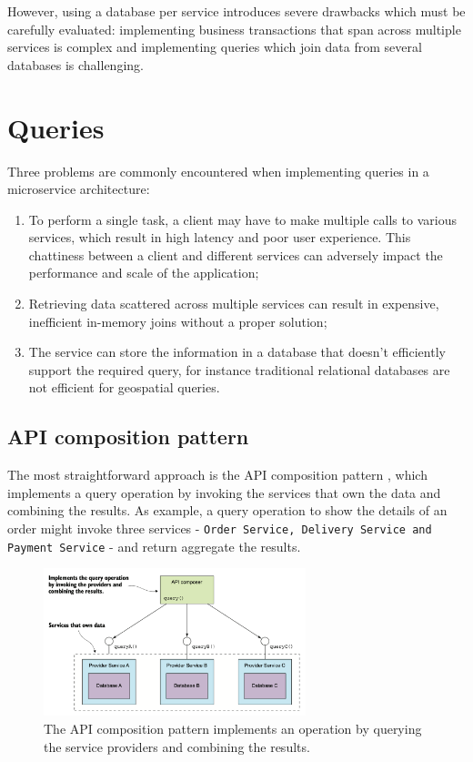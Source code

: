 \documentclass[conference]{IEEEtran}
\begin{document}
However, using a database per service introduces severe drawbacks which must be carefully evaluated: implementing business transactions that span across multiple services is complex and implementing queries which join data from several databases is challenging.

\section{Queries}

Three problems are commonly encountered when implementing queries in a microservice architecture:

\begin{enumerate}
  \item To perform a single task, a client may have to make multiple calls to various  services, which result in high latency and poor user experience. This chattiness between a client and different services can adversely impact the performance and scale of the application;
  \item Retrieving data scattered across multiple services can result in expensive, inefficient in-memory joins without a proper solution;
  \item The service can store the information in a database that doesn’t efficiently support the required query, for instance traditional relational databases are not efficient for geospatial queries.
\end{enumerate}

\subsection{API composition pattern}

The most straightforward approach is the API composition pattern \cite{microservices-patterns-api-composition}, which implements a query operation by invoking the services that own the data and combining the results. As example, a query operation to show the details of an order might invoke three services - \texttt{Order Service, Delivery Service and Payment Service} - and return aggregate the results.

\begin{figure}[!htbp]
\centering
\includegraphics[width=3in]{jpeg/api-composition}
\caption{The API composition pattern implements an operation by querying the service providers and combining the results. \cite{microservices-patterns-api-composition}}
\label{cqrs}
\end{figure}
\end{document}
